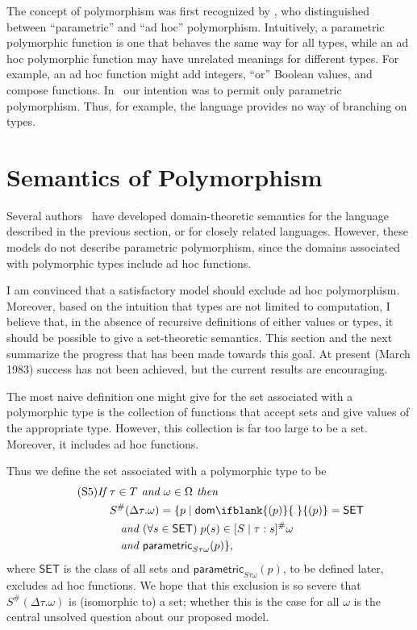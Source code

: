 \documentclass[sigplan,screen,nonacm,balance=false]{acmart}
\theoremstyle{plain}
\DeclarePairedDelimiter{\set}{\{}{\}}
\newcommand{\dom}[1]{\mathsf{dom}\ifblank{#1}{\;}{#1}}
\newcommand{\SET}{\mathsf{SET}}
\newcommand{\para}{\mathsf{parametric}}
\begin{document}
The concept of polymorphism was first recognized by \citet{fundamental}, who distinguished between ``parametric'' and ``ad hoc'' polymorphism.
Intuitively, a parametric polymorphic function is one that behaves the same way for all types, while an ad hoc polymorphic function may have unrelated meanings for different types.
For example, an ad hoc function might add integers, ``or'' Boolean values, and compose functions.
In~\citep{polymorphism} our intention was to permit only parametric polymorphism.
Thus, for example, the language provides no way of branching on types.

\section{Semantics of Polymorphism}

Several authors~\citep{polytype,retract,applicative,repindep,polydata} have developed domain-theoretic semantics for the language described in the previous section, or for closely related languages.
However, these models do not describe parametric polymorphism, since the domains associated with polymorphic types include ad hoc functions.

I am convinced that a satisfactory model should exclude ad hoc polymorphism.
Moreover, based on the intuition that types are not limited to computation, I believe that, in the absence of recursive definitions of either values or types, it should be possible to give a set-theoretic semantics.
This section and the next summarize the progress that has been made towards this goal.
At present (March 1983) success has not been achieved, but the current results are encouraging.

The most naive definition one might give for the set associated with a polymorphic type is the collection of functions that accept sets and give values of the appropriate type.
However, this collection is far too large to be a set.
Moreover, it includes ad hoc functions.

Thus we define the set associated with a polymorphic type to be
%
\begin{align*}\tag{S5}
  \textit{If } & \tau \in T \textit{ and } \omega \in \Omega \textit{ then } \\
  & S^\#(\Delta \tau. \omega) = \set{p \mid \dom{(p)} = \SET \\
  & \quad \textit{and } (\forall s \in \SET) \; p(s) \in [S \mid \tau: s]^\# \omega \\
  & \quad \textit{and } \para_{S \tau \omega}(p)},
\end{align*}
%
where $\SET$ is the class of all sets and $\para_{S \tau \omega}(p)$, to be defined later, excludes ad hoc functions.
We hope that this exclusion is so severe that $S^\#(\Delta \tau. \omega)$ is (isomorphic to) a set; whether this is the case for all $\omega$ is the central unsolved question about our proposed model.
\end{document}
